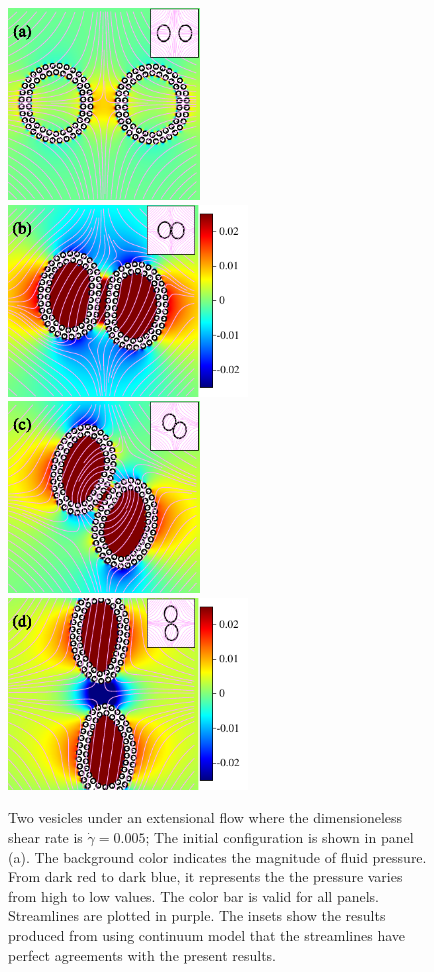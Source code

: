 \documentclass[lineno]{jfm}
\begin{document}
\begin{figure}
\centering
\includegraphics[height=2in]{N116_ext_0.pdf}
\includegraphics[height=2in]{N116_ext_2000.pdf}\\
\includegraphics[height=2in]{N116_ext_4000.pdf}
\includegraphics[height=2in]{N116_ext_6500.pdf}
  \caption{Two vesicles under an extensional flow where the dimensioneless shear rate is $\dot\gamma=0.005$; The initial configuration is shown in panel (a). The background color indicates the magnitude of fluid pressure. From dark red to dark blue, it represents the the pressure varies from high to low values. The color bar is valid for all panels. Streamlines are plotted in purple. The insets show the results produced from using continuum model that the streamlines have perfect agreements with the present results.
  }
    \label{figure8}
\end{figure}
\end{document}
